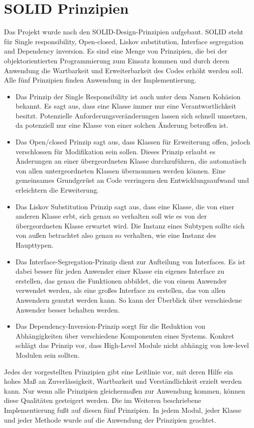 \section{SOLID Prinzipien}

Das Projekt wurde nach den SOLID-Design-Prinzipien \cite{unclebob1995} aufgebaut. SOLID steht für Single responsibility, Open-closed, Liskov substitution, Interface segregation and Dependency inversion. Es sind  eine Menge von Prinzipien, die bei der objektorientierten Programmierung zum Einsatz kommen und durch deren Anwendung die Wartbarkeit und Erweiterbarkeit des Codes erhöht werden soll. Alle fünf Prinzipien finden Anwendung in der Implementierung.

\begin{itemize}
\item Das Prinzip der Single Responsibility  ist auch unter dem Namen Kohäsion bekannt. Es sagt aus, dass eine Klasse immer nur eine Verantwortlichkeit besitzt.  Potenzielle Anforderungsveränderungen lassen sich schnell umsetzen, da potenziell nur eine Klasse von einer solchen Änderung betroffen ist.
\item Das Open/closed Prinzip sagt aus, dass Klassen für Erweiterung offen, jedoch verschlossen für Modifikation sein sollen. Dieses Prinzip erlaubt es Änderungen an einer übergeordneten Klasse durchzuführen, die automatisch von allen untergeordneten Klassen übernommen werden können. Eine gemeinsames Grundgerüst an Code verringern den Entwicklungsaufwand und erleichtern die Erweiterung.
\item Das Liskov Substitution Prinzip sagt aus, dass eine Klasse, die von einer anderen Klasse erbt, sich genau so verhalten soll wie es von der übergeordneten Klasse erwartet wird. Die Instanz eines Subtypen sollte sich von außen betrachtet also genau so verhalten, wie eine Instanz des Haupttypen.
\item Das Interface-Segregation-Prinzip dient zur Aufteilung von Interfaces. Es ist dabei besser für jeden Anwender einer Klasse ein eigenes Interface zu erstellen, das genau die Funktionen abbildet, die von einem Anwender verwendet werden, als eine großes Interface zu erstellen, das von allen Anwendern genutzt werden kann. So kann der Überblick über verschiedene Anwender besser behalten werden.
\item Das Dependency-Inversion-Prinzip sorgt für die Reduktion von Abhängigkeiten über verschiedene Komponenten eines Systems. Konkret schlägt das Prinzip vor, dass High-Level Module nicht abhängig von low-level Modulen sein sollten.
\end{itemize}

Jedes der vorgestellten Prinzipien gibt eine Leitlinie vor, mit deren Hilfe ein hohes Maß an Zuverlässigkeit, Wartbarkeit und Verständlichkeit erzielt werden kann. Nur wenn alle Prinzipien gleichermaßen zur Anwendung kommen, können diese Qualitäten gesteigert werden. Die im Weiteren beschriebene Implementierung fußt auf diesen fünf Prinzipien. In jedem Modul, jeder Klasse und jeder Methode wurde auf die Anwendung der Prinzipien geachtet.